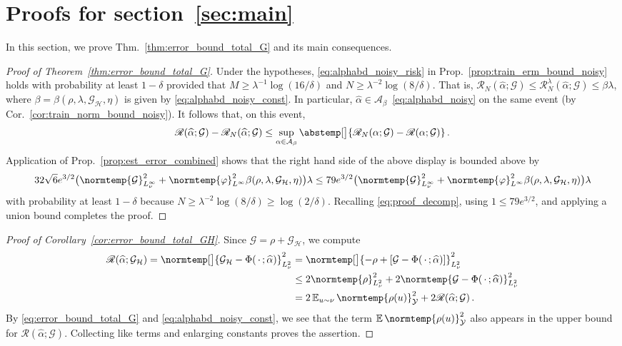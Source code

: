 \documentclass{article}
\theoremstyle{plain}
\theoremstyle{my_def}
\theoremstyle{my_rem}
\numberwithin{equation}{section}
\numberwithin{theorem}{section}%
\newcommand{\E}{\mathbb{E}}
\newcommand{\scrR}{\mathscr{R}}
\newcommand{\cA}{\mathcal{A}}
\newcommand{\cG}{\mathcal{G}}
\newcommand{\cH}{\mathcal{H}}
\newcommand{\cY}{\mathcal{Y}}
\newcommand{\norm}{\normtemp}
\newcommand{\abs}{\abstemp}
\renewcommand{\hat}{\widehat}
\newcommand{\slot}{{\,\cdot\,}}
\renewcommand{\E}{\operatorname{\mathbb{E}}} %
\newcommand{\al}{\alpha}
\newcommand{\GH}{\cG_{\cH}}
\renewcommand{\phi}{\varphi}
\newcommand{\alhat}{\hat{\al}}
\begin{document}
\section{Proofs for section~\ref{sec:main}}\label{app:proof_main}
In this section, we prove Thm.~\ref{thm:error_bound_total_G} and its main consequences.

\begin{proof}[Proof of Theorem~\ref{thm:error_bound_total_G}]
Under the hypotheses, \eqref{eq:alphabd_noisy_risk} in Prop.~\ref{prop:train_erm_bound_noisy} holds with probability at least $1-\delta$ provided that $M\geq \lambda^{-1}\log(16/\delta)$ and $N\geq \lambda^{-2}\log(8/\delta)$. That is, $\scrR_N(\hat{\alpha};\cG)\leq \scrR^{\lambda}_N(\hat{\alpha};\cG)\leq \beta\lambda$, where $\beta=\beta(\rho,\lambda,\GH,\eta)$ is given by \eqref{eq:alphabd_noisy_const}. In particular, $\alhat\in \cA_\beta$~\eqref{eq:alphabd_noisy} on the same event (by Cor.~\ref{cor:train_norm_bound_noisy}). It follows that, on this event, 
\begin{equation*}
    \scrR(\hat{\alpha};\cG)-\scrR_N(\hat{\alpha};\cG)\leq \sup_{\al\in\cA_\beta}\abs[\big]{\scrR_N(\al;\cG) - \scrR(\al;\cG)}\,.
\end{equation*}
Application of Prop.~\ref{prop:est_error_combined} shows that the right hand side of the above display is bounded above by
\begin{equation*}
    32\sqrt{6}e^{3/2}\bigl(\norm{\cG}_{L_\nu^\infty}^2 + \norm{\phi}_{L^\infty}^2 \beta(\rho,\lambda,\GH,\eta)\bigr)\lambda\leq 79e^{3/2}\bigl(\norm{\cG}_{L_\nu^\infty}^2 + \norm{\phi}_{L^\infty}^2 \beta(\rho,\lambda,\GH,\eta)\bigr)\lambda
\end{equation*}
with probability at least $1-\delta$ because $N\geq\lambda^{-2}\log(8/\delta)\geq \log(2/\delta)$. Recalling \eqref{eq:proof_decomp}, using $1\leq 79e^{3/2}$, and applying a union bound completes the proof.
\end{proof}

\begin{proof}[Proof of Corollary~\ref{cor:error_bound_total_GH}]
    Since $\cG=\rho+\GH$, we compute
    \begin{align*}
        \scrR(\alhat;\GH)=\norm[\big]{\GH-\Phi(\slot;\alhat)}_{L^2_\nu}^2&=\norm[\big]{-\rho + [\cG-\Phi(\slot;\alhat)]}_{L^2_\nu}^2\\
        &\leq 2\norm{\rho}_{L^2_\nu}^2 + 2\norm{\cG-\Phi(\slot;\alhat)}_{L^2_\nu}^2\\
        & = 2\E_{u\sim\nu}\norm{\rho(u)}_{\cY}^2 + 2\scrR(\alhat;\cG)\,.
    \end{align*}
    By \eqref{eq:error_bound_total_G} and \eqref{eq:alphabd_noisy_const}, we see that the term $\E\norm{\rho(u)}_{\cY}^2$ also appears in the upper bound for $\scrR(\alhat;\cG)$. Collecting like terms and enlarging constants proves the assertion.
\end{proof}
\end{document}

